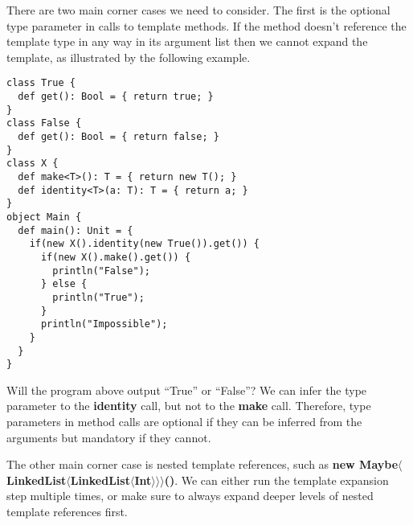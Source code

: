 There are two main corner cases we need to consider. The first is the optional
type parameter in calls to template methods. If the method doesn't reference the
template type in any way in its argument list then we cannot expand the template,
as illustrated by the following example.

\begin{lstlisting}
class True {
  def get(): Bool = { return true; }
}
class False {
  def get(): Bool = { return false; }
}
class X {
  def make<T>(): T = { return new T(); }
  def identity<T>(a: T): T = { return a; }
}
object Main {
  def main(): Unit = {
    if(new X().identity(new True()).get()) {
      if(new X().make().get()) {
        println("False");
      } else {
        println("True");
      }
      println("Impossible");
    }
  }
}
\end{lstlisting}

Will the program above output ``True'' or ``False''? We can infer the type
parameter to the \textbf{identity} call, but not to the \textbf{make} call.
Therefore, type parameters in method calls are optional if they can be inferred
from the arguments but mandatory if they cannot.

The other main corner case is nested template references, such as
\textbf{new
Maybe$\langle$LinkedList$\langle$LinkedList$\langle$Int$\rangle\rangle\rangle$()}.
We can either run the template expansion step multiple times, or make sure to
always expand deeper levels of nested template references first.
